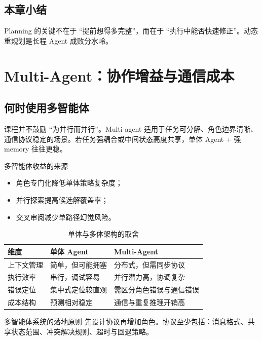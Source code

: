 \documentclass[a4paper]{article}
\begin{document}
\subsection{本章小结}
Planning 的关键不在于 ``提前想得多完整''，而在于 ``执行中能否快速修正''。动态重规划是长程 Agent 成败分水岭。

\section{Multi-Agent：协作增益与通信成本}

\subsection{何时使用多智能体}
课程并不鼓励 ``为并行而并行''。Multi-agent 适用于任务可分解、角色边界清晰、通信协议稳定的场景。若任务强耦合或中间状态高度共享，单体 Agent + 强 memory 往往更稳。

\begin{knowledgebox}{多智能体收益的来源}
\begin{itemize}
    \item 角色专门化降低单体策略复杂度；
    \item 并行探索提高候选解覆盖率；
    \item 交叉审阅减少单路径幻觉风险。
\end{itemize}
\end{knowledgebox}

\begin{table}[H]
\centering
\begin{tabular}{p{3.3cm}p{3.8cm}p{3.9cm}}
\toprule
\textbf{维度} & \textbf{单体 Agent} & \textbf{Multi-Agent} \\
\midrule
上下文管理 & 简单，但可能拥塞 & 分布式，但需同步协议 \\
执行效率 & 串行，调试容易 & 并行潜力高，协调复杂 \\
错误定位 & 集中式定位较直观 & 需区分角色错误与通信错误 \\
成本结构 & 预测相对稳定 & 通信与重复推理开销高 \\
\bottomrule
\end{tabular}
\caption{单体与多体架构的取舍}
\end{table}

\begin{importantbox}{多智能体系统的落地原则}
先设计协议再增加角色。协议至少包括：消息格式、共享状态范围、冲突解决规则、超时与回退策略。
\end{importantbox}
\end{document}
